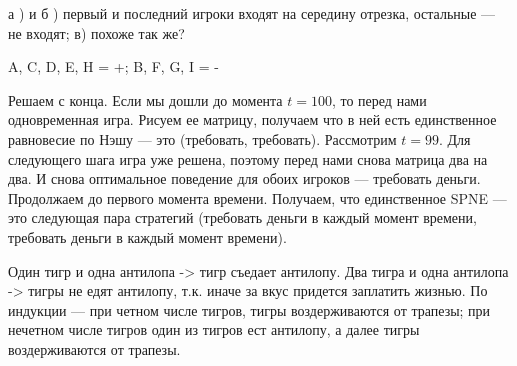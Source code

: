\begin{solution}{6.7}
а )  и б ) первый и последний игроки входят на середину отрезка, остальные --- не входят;
в)  похоже так же?
\end{solution}
\begin{solution}{6.8}

\end{solution}
\begin{solution}{6.9}
\end{solution}
\begin{solution}{6.10}

\end{solution}
\begin{solution}{6.11}

\end{solution}
\begin{solution}{6.12}
 A, C, D, E, H = +; B, F, G, I = -
\end{solution}
\begin{solution}{6.13}
Решаем с конца. Если мы дошли до момента $t=100$, то перед нами одновременная игра. Рисуем ее матрицу, получаем что в ней есть единственное равновесие по Нэшу --- это (требовать, требовать). Рассмотрим $t=99$. Для следующего шага игра уже решена, поэтому перед нами снова матрица два на два. И снова оптимальное поведение для обоих игроков --- требовать деньги. Продолжаем до первого момента времени. Получаем, что единственное SPNE --- это следующая пара стратегий (требовать деньги в каждый момент времени, требовать деньги в каждый момент времени).
\end{solution}
\begin{solution}{6.14}

\end{solution}
\begin{solution}{6.15}
 Один тигр и одна антилопа -> тигр съедает антилопу. Два тигра и одна антилопа -> тигры не едят антилопу, т.к. иначе за вкус придется заплатить жизнью. По индукции --- при четном числе тигров, тигры воздерживаются от трапезы; при нечетном числе тигров один из тигров ест антилопу, а далее тигры воздерживаются от трапезы.
\end{solution}
\begin{solution}{6.16}

\end{solution}
\begin{solution}{6.17}

\end{solution}
\begin{solution}{6.18}

\end{solution}
